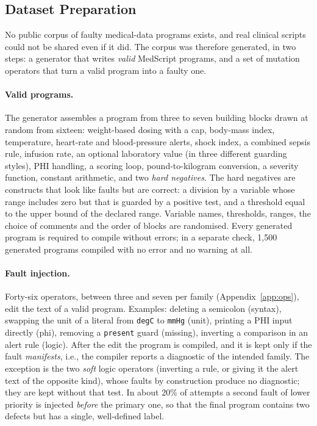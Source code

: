\documentclass[conference]{IEEEtran}
\newcommand{\code}[1]{\texttt{#1}}
\begin{document}
\subsection{Dataset Preparation}

No public corpus of faulty medical-data programs exists, and real clinical scripts could not be shared even if
it did. The corpus was therefore generated, in two steps: a generator that writes \emph{valid} MedScript programs,
and a set of mutation operators that turn a valid program into a faulty one.

\paragraph{Valid programs.} The generator assembles a program from three to seven building blocks drawn at random
from sixteen: weight-based dosing with a cap, body-mass index, temperature, heart-rate and blood-pressure alerts, shock
index, a combined sepsis rule, infusion rate, an optional laboratory value (in three different guarding styles),
PHI handling, a scoring loop, pound-to-kilogram conversion, a severity function, constant arithmetic, and two
\emph{hard negatives}. The hard negatives are constructs that look like faults but are correct: a division by a
variable whose range includes zero but that is guarded by a positive test, and a threshold equal to the upper bound of
the declared range. Variable names, thresholds, ranges, the choice of comments and the order of blocks are
randomised. Every generated program is required to compile without errors; in a separate check, 1{,}500 generated
programs compiled with no error and no warning at all.

\paragraph{Fault injection.} Forty-six operators, between three and seven per family (Appendix~\ref{app:ops}), edit the text of a valid
program. Examples: deleting a semicolon (syntax), swapping the unit of a literal from \code{degC} to \code{mmHg}
(unit), printing a PHI input directly (phi), removing a \code{present} guard (missing),
inverting a comparison in an alert rule (logic). After the edit the program is compiled, and it is kept only if the
fault \emph{manifests}, i.e., the compiler reports a diagnostic of the intended family. The exception is the two
\emph{soft} logic operators (inverting a rule, or giving it the alert text of the opposite kind), whose faults
by construction produce no diagnostic; they are kept without that test. In about 20\% of attempts a second fault of
lower priority is injected \emph{before} the primary one, so that the final program contains two defects but has a
single, well-defined label.
\end{document}
